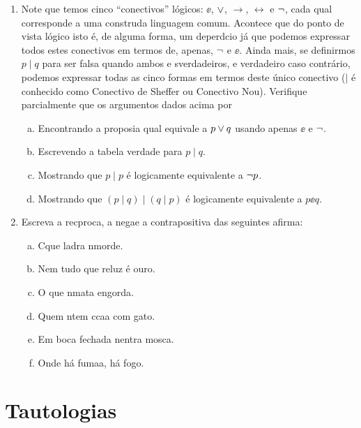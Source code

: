 \begin{enumerate}[{\bf 1.}]
\item Note que temos cinco ``conectivos'' l\'ogicos: $\ee$, $\vee$, $\to$, $\leftrightarrow$ e $\lnot$, cada qual corresponde a uma constru\cao da linguagem comum. Acontece que do ponto de vista l\'ogico isto \'e, de alguma forma, um deperd\ih cio já que podemos expressar todos estes conectivos em termos de, apenas, $\lnot$ e $\ee$. Ainda mais, se definirmos $p\mid q$ para ser falsa quando ambos \pp e \qq s\ao verdadeiros, e verdadeiro caso contr\'ario, podemos expressar todas as cinco formas em termos deste \'unico conectivo ($\mid $ \'e conhecido como Conectivo de Sheffer ou Conectivo Nou). Verifique parcialmente que os argumentos dados acima por
\begin{enumerate}[a)]
\item Encontrando a proposi\cao a qual equivale a $p \vee q$ usando apenas $\ee$ e $\lnot$.
\item Escrevendo a tabela verdade para $p\mid q$.
\item Mostrando que $p\mid p$ \'e logicamente equivalente a $\lnot p$.
\item Mostrando que $(p\mid q)\mid (q\mid p)$ \'e logicamente equivalente a $p \ee q$.
\end{enumerate}

\item Escreva a rec\ih proca, a nega\cao e a contrapositiva das seguintes afirma\cois:
\begin{enumerate}[a)]
\item C\ao que ladra n\ao morde.
\item Nem tudo que reluz \'e ouro.
\item O que n\ao mata engorda.
\item Quem n\ao tem c\ao ca\cc a com gato.
\item Em boca fechada n\ao entra mosca.
\item Onde h\'a fuma\cc a, h\'a fogo.
\end{enumerate}
\end{enumerate}

\section{Tautologias}\label{tautologias}

